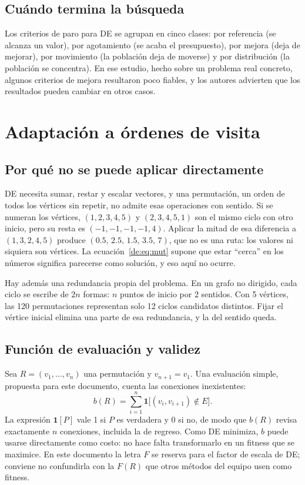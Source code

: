 \subsection{Cuándo termina la búsqueda}
Los criterios de paro para DE se agrupan en cinco clases: por referencia (se alcanza un valor), por agotamiento (se acaba el presupuesto), por mejora (deja de mejorar), por movimiento (la población deja de moverse) y por distribución (la población se concentra).\cite{de12} En ese estudio, hecho sobre un problema real concreto, algunos criterios de mejora resultaron poco fiables, y los autores advierten que los resultados pueden cambiar en otros casos.\cite{de12}

\section{Adaptación a órdenes de visita}
\subsection{Por qué no se puede aplicar directamente}
DE necesita sumar, restar y escalar vectores, y una permutación, un orden de todos los vértices sin repetir, no admite esas operaciones con sentido. Si se numeran los vértices, $(1,2,3,4,5)$ y $(2,3,4,5,1)$ son el mismo ciclo con otro inicio, pero su resta es $(-1,-1,-1,-1,4)$. Aplicar la mitad de esa diferencia a $(1,3,2,4,5)$ produce $(0.5,\,2.5,\,1.5,\,3.5,\,7)$, que no es una ruta: los valores ni siquiera son vértices. La ecuación~\eqref{de:eq:mut} supone que estar ``cerca'' en los números significa parecerse como solución, y eso aquí no ocurre.

Hay además una redundancia propia del problema. En un grafo no dirigido, cada ciclo se escribe de $2n$ formas: $n$ puntos de inicio por 2 sentidos. Con 5 vértices, las 120 permutaciones representan solo 12 ciclos candidatos distintos. Fijar el vértice inicial elimina una parte de esa redundancia, y la del sentido queda.

\subsection{Función de evaluación y validez}
Sea $R=(v_1,\ldots,v_n)$ una permutación y $v_{n+1}=v_1$. Una evaluación simple, propuesta para este documento, cuenta las conexiones inexistentes:
\begin{equation}
b(R)=\sum_{i=1}^{n}\mathbf{1}\bigl[(v_i,v_{i+1})\notin E\bigr].\label{de:eq:b}
\end{equation}
La expresión $\mathbf{1}[P]$ vale 1 si $P$ es verdadera y 0 si no, de modo que $b(R)$ revisa exactamente $n$ conexiones, incluida la de regreso. Como DE minimiza, $b$ puede usarse directamente como costo: no hace falta transformarlo en un fitness que se maximice. En este documento la letra $F$ se reserva para el factor de escala de DE; conviene no confundirla con la $F(R)$ que otros métodos del equipo usen como fitness.

